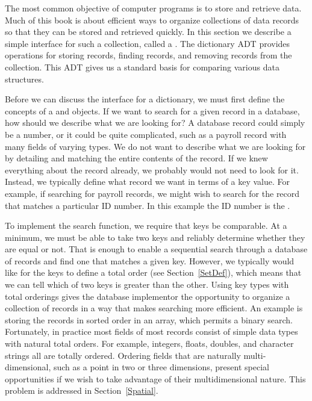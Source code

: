 The most common objective of computer programs is to store and
retrieve data.
Much of this book is about efficient ways to organize collections of
data records so that they can be stored and retrieved quickly.
In this section we describe a simple interface for such a collection,
called a .
The dictionary ADT provides operations for storing records, finding
records, and removing records from the collection.
This ADT gives us a standard basis for comparing various data
structures.

Before we can discuss the interface for a dictionary, we must
first define the concepts of a  and 
objects.
If we want to search for a given record in a database, how should we
describe what we are looking for?
A database record could simply be a number, or it could be quite
complicated, such as a payroll record with many fields of varying
types.
We do not want to describe what we are looking for by detailing and
matching the entire contents of the record.
If we knew everything about the record already, we probably would not
need to look for it.
Instead, we typically define what record we want in terms of a
key value.
For example, if searching for payroll records, we might wish to
search for the record that matches a particular ID number.
In this example the ID number is the .

To implement the search function, we require that keys be comparable.
At a minimum, we must be able to take two keys and reliably determine
whether they are equal or not.
That is enough to enable a sequential search through a database of
records and find one that matches a given key.
However, we typically would like for the keys to define a
total order (see Section~\ref{SetDef}), which means that we can tell
which of two keys is greater than the other.
Using key types with total orderings gives the database
implementor the opportunity to organize a collection of records in
a way that makes searching more efficient.
An example is storing the records in sorted order in an array, which
permits a binary search.
Fortunately, in practice most fields of most records consist of
simple data types with natural total orders.
For example, integers, floats, doubles, and character strings all are
totally ordered.
Ordering fields that are naturally multi-dimensional, such as a point
in two or three dimensions, present special opportunities if we wish
to take advantage of their multidimensional nature.
This problem is addressed in Section~\ref{Spatial}.

